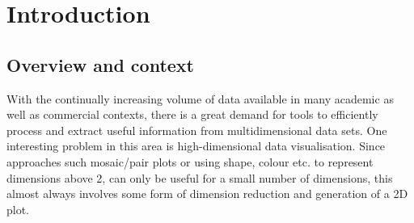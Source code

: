 \documentclass{l4proj}
\begin{document}
%
%
%

%
%
%
%
\chapter{Introduction}



\section{Overview and context}

With the continually increasing volume of data available in many academic as well as commercial contexts, there is a great demand for tools to efficiently process and extract useful information from multidimensional data sets. One interesting problem in this area is high-dimensional data visualisation. Since approaches such mosaic/pair plots or using shape, colour etc. to represent dimensions above 2, can only be useful for a small number of dimensions, this almost always involves some form of dimension reduction and generation of a 2D plot. 
\end{document}
